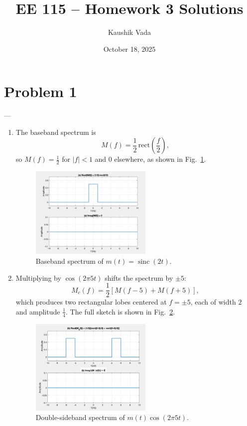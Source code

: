 \documentclass[12pt]{article}
\title{EE 115 – Homework 3 Solutions}
\author{Kaushik Vada}
\date{October 18, 2025}
\DeclareMathOperator{\sinc}{sinc}
\begin{document}
\maketitle

\section*{Problem 1}

---

\begin{enumerate}[label=(\alph*)]
\item The baseband spectrum is
\[
M(f) = \frac{1}{2}\,\mathrm{rect}\left(\frac{f}{2}\right),
\]
so \(M(f) = \frac{1}{2}\) for \(|f| < 1\) and \(0\) elsewhere, as shown in Fig.~\ref{fig:prob1a}.

\begin{figure}[H]
\centering
\includegraphics[width=0.55\textwidth]{images/Question1/1a.png}
\caption{Baseband spectrum of \(m(t)=\sinc(2t)\).}
\label{fig:prob1a}
\end{figure}

\item Multiplying by \(\cos(2\pi 5t)\) shifts the spectrum by \(\pm 5\):
\[
M_c(f) = \frac{1}{2}\left[ M(f-5) + M(f+5) \right],
\]
which produces two rectangular lobes centered at \( f = \pm 5 \), each of width \(2\) and amplitude \( \frac{1}{4} \). The full sketch is shown in Fig.~\ref{fig:prob1b}.

\begin{figure}[H]
\centering
\includegraphics[width=0.55\textwidth]{images/Question1/1b.png}
\caption{Double-sideband spectrum of \(m(t)\cos(2\pi 5t)\).}
\label{fig:prob1b}
\end{figure}


\end{enumerate}
\end{document}
